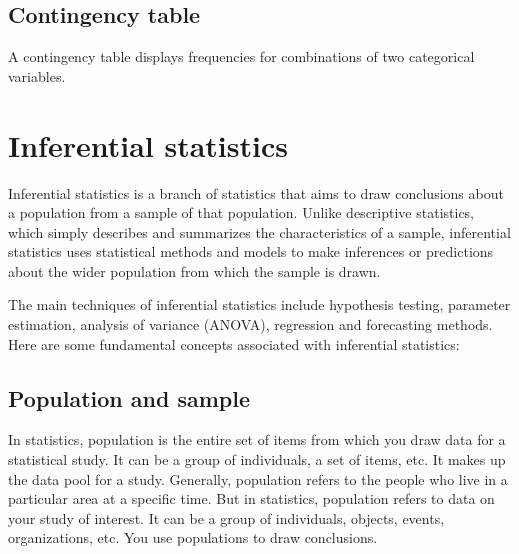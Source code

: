 \documentclass[
]{book}
\newenvironment{Shaded}{\begin{snugshade}}{\end{snugshade}}
\newcommand{\AttributeTok}[1]{\textcolor[rgb]{0.13,0.29,0.53}{#1}}
\newcommand{\CommentTok}[1]{\textcolor[rgb]{0.56,0.35,0.01}{\textit{#1}}}
\newcommand{\FunctionTok}[1]{\textcolor[rgb]{0.13,0.29,0.53}{\textbf{#1}}}
\newcommand{\NormalTok}[1]{#1}
\newcommand{\SpecialCharTok}[1]{\textcolor[rgb]{0.81,0.36,0.00}{\textbf{#1}}}
\newcommand{\StringTok}[1]{\textcolor[rgb]{0.31,0.60,0.02}{#1}}
\begin{document}
\hypertarget{contingency-table}{%
\section{Contingency table}\label{contingency-table}}

A contingency table displays frequencies for combinations of two categorical variables.

\begin{Shaded}
\end{Shaded}

\hypertarget{inferential-statistics}{%
\chapter{Inferential statistics}\label{inferential-statistics}}

Inferential statistics is a branch of statistics that aims to draw conclusions about a population from a sample of that population. Unlike descriptive statistics, which simply describes and summarizes the characteristics of a sample, inferential statistics uses statistical methods and models to make inferences or predictions about the wider population from which the sample is drawn.

The main techniques of inferential statistics include hypothesis testing, parameter estimation, analysis of variance (ANOVA), regression and forecasting methods. Here are some fundamental concepts associated with inferential statistics:

\hypertarget{population-and-sample}{%
\section{Population and sample}\label{population-and-sample}}

In statistics, population is the entire set of items from which you draw data for a statistical study. It can be a group of individuals, a set of items, etc. It makes up the data pool for a study. Generally, population refers to the people who live in a particular area at a specific time. But in statistics, population refers to data on your study of interest. It can be a group of individuals, objects, events, organizations, etc. You use populations to draw conclusions.
\end{document}

